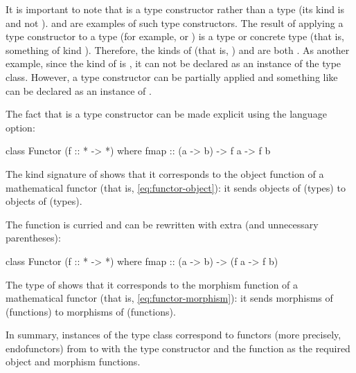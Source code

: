 It is important to note that  is a type constructor
rather than a type (its kind is \texthaskell{* -> *} and not
\texthaskell{*}). \texthaskell{[]} and  are
examples of such type constructors. The result of applying a type
constructor to a type (for example,  or
) is a type or concrete type (that is, something of
kind \texthaskell{*}). Therefore, the kinds of 
(that is, \texthaskell{[Int]}) and  are both
\texthaskell{*}. As another example, since the kind of
 is \texthaskell{* -> * -> *}, it can not be
declared as an instance of the  type class.
However, a type constructor can be partially applied and something
like  can be declared as an instance of
.

The fact that  is a type constructor can be made
explicit using the  language option:
\begin{codehaskell}
class Functor (f :: * -> *) where
  fmap :: (a -> b) -> f a -> f b
\end{codehaskell}
The kind signature of  shows that it corresponds to the
object function of a mathematical functor (that is,
\eqref{eq:functor-object}): it sends objects of \hask (types) to
objects of \hask (types).

The  function is curried and can be rewritten with
extra (and unnecessary parentheses):
\begin{codehaskell}
class Functor (f :: * -> *) where
  fmap :: (a -> b) -> (f a -> f b)
\end{codehaskell}
The type of  shows that it corresponds to the
morphism function of a mathematical functor (that is,
\eqref{eq:functor-morphism}): it sends morphisms of \hask (functions)
to morphisms of \hask (functions).

In summary, instances of the  type class
correspond to functors (more precisely, endofunctors) from \hask to
\hask with the type constructor and the  function as
the required object and morphism functions.

